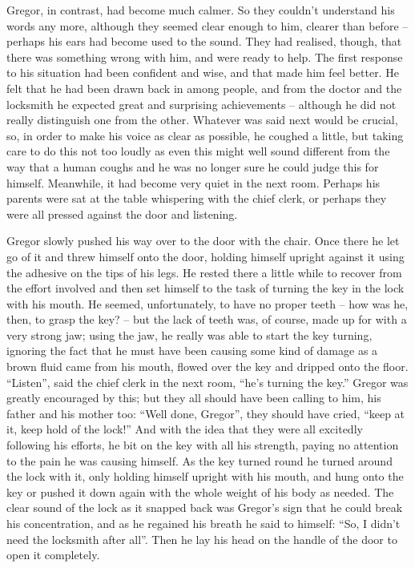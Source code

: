 Gregor, in contrast, had become much calmer. So they couldn’t
understand his words any more, although they seemed clear enough to
him, clearer than before – perhaps his ears had become used to the sound.
They had realised, though, that there was something wrong with him, and
were ready to help. The first response to his situation had been
confident and wise, and that made him feel better. He felt that he had
been drawn back in among people, and from the doctor and the locksmith
he expected great and surprising achievements – although he did not
really distinguish one from the other. Whatever was said next would be
crucial, so, in order to make his voice as clear as possible, he
coughed a little, but taking care to do this not too loudly as even
this might well sound different from the way that a human coughs and he
was no longer sure he could judge this for himself. Meanwhile, it had
become very quiet in the next room. Perhaps his parents were sat at the
table whispering with the chief clerk, or perhaps they were all pressed
against the door and listening.

Gregor slowly pushed his way over to the door with the chair. Once
there he let go of it and threw himself onto the door, holding himself
upright against it using the adhesive on the tips of his legs. He
rested there a little while to recover from the effort involved and
then set himself to the task of turning the key in the lock with his
mouth. He seemed, unfortunately, to have no proper teeth – how was he,
then, to grasp the key? – but the lack of teeth was, of course, made up
for with a very strong jaw; using the jaw, he really was able to start
the key turning, ignoring the fact that he must have been causing some
kind of damage as a brown fluid came from his mouth, flowed over the
key and dripped onto the floor. “Listen”, said the chief clerk in the
next room, “he’s turning the key.” Gregor was greatly encouraged by
this; but they all should have been calling to him, his father and his
mother too: “Well done, Gregor”, they should have cried, “keep at it,
keep hold of the lock!” And with the idea that they were all excitedly
following his efforts, he bit on the key with all his strength, paying
no attention to the pain he was causing himself. As the key turned
round he turned around the lock with it, only holding himself upright
with his mouth, and hung onto the key or pushed it down again with the
whole weight of his body as needed. The clear sound of the lock as it
snapped back was Gregor’s sign that he could break his concentration,
and as he regained his breath he said to himself: “So, I didn’t need
the locksmith after all”. Then he lay his head on the handle of the
door to open it completely.

